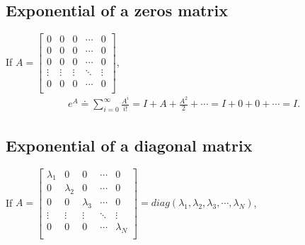 \documentclass[letterpaper,10pt,english]{jupyterBook}
\begin{document}
\subsection{Exponential of a zeros matrix}
\label{\detokenize{appendix:exponential-of-a-zeros-matrix}}
\sphinxAtStartPar
If \(A =   
\left[ {\begin{array}{ccccc}
    0 & 0 & 0 & \dotsm & 0\\
    0 & 0 & 0 & \dotsm & 0\\
    0 & 0 & 0 & \dotsm & 0\\
    \vdots & \vdots & \vdots & \ddots & \vdots\\
    0 & 0 & 0 & \dotsm & 0\\
\end{array} } \right] \),
\begin{equation*}
\begin{split}
    e^A \doteq \sum_{i=0}^{\infty} \frac{A^i}{i!} = I + A + \frac{A^2}{2} + \dotsm = I + 0 + 0 + \dotsm = I.
\end{split}
\end{equation*}

\subsection{Exponential of a diagonal matrix}
\label{\detokenize{appendix:exponential-of-a-diagonal-matrix}}
\sphinxAtStartPar
If \(A =   
\left[ {\begin{array}{ccccc}
    \lambda_1 & 0 & 0 & \dotsm & 0\\
    0 & \lambda_2 & 0 & \dotsm & 0\\
    0 & 0 & \lambda_3 & \dotsm & 0\\
    \vdots & \vdots & \vdots & \ddots & \vdots\\
    0 & 0 & 0 & \dotsm & \lambda_{N}\\
\end{array} } \right] 
  = diag(\lambda_1, \lambda_2, \lambda_3, \dotsm, \lambda_N)\),
\end{document}
